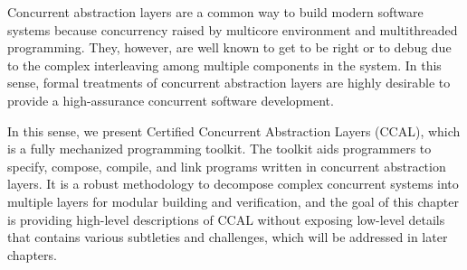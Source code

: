 
Concurrent abstraction layers are a common way to build modern software systems because concurrency raised by multicore environment and multithreaded programming. 
They, however, are well known to get to be right or to debug due to the complex interleaving among multiple components in the system. 
In this sense, formal treatments of concurrent abstraction layers are highly desirable to provide a 
high-assurance concurrent software development. 

In this sense, we present Certified Concurrent Abstraction Layers (CCAL), which is a fully mechanized programming toolkit.
The toolkit aids programmers to specify, compose, compile, and link programs written in
concurrent abstraction layers.
It is a robust methodology to decompose complex concurrent systems into multiple layers for modular building and verification,
and the goal of this chapter is providing high-level descriptions of CCAL without exposing low-level details that contains various subtleties and challenges, which will be addressed in later chapters. 
